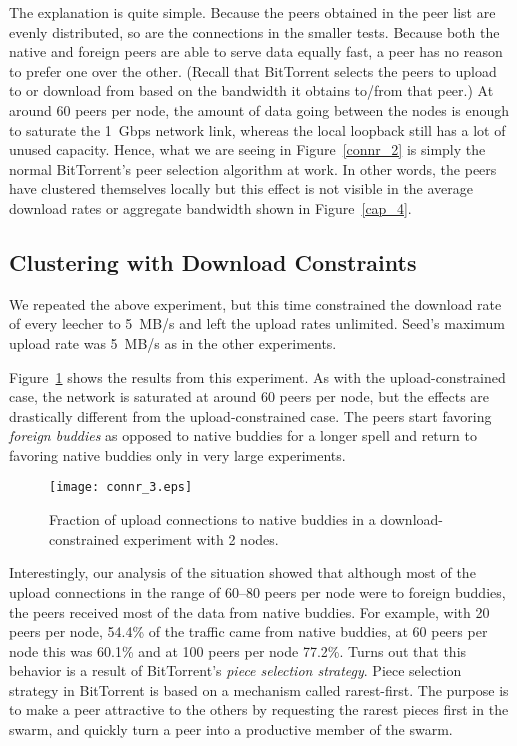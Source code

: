 \documentclass[10pt,letterpaper,twocolumn]{article}
\begin{document}
The explanation is quite simple. Because the peers obtained in the
peer list are evenly distributed, so are the connections in the
smaller tests. Because both the native and foreign peers are able to
serve data equally fast, a peer has no reason to prefer one over the
other. (Recall that BitTorrent selects the peers to upload to or
download from based on the bandwidth it obtains to/from that peer.) At
around 60 peers per node, the amount of data going between the nodes
is enough to saturate the 1~Gbps network link, whereas the local
loopback still has a lot of unused capacity. Hence, what we are seeing
in Figure~\ref{connr_2} is simply the normal BitTorrent's peer
selection algorithm at work. In other words, the peers have clustered
themselves locally but this effect is not visible in the average
download rates or aggregate bandwidth shown in Figure~\ref{cap_4}. 





\subsection{Clustering with Download Constraints}
\label{cluster_nodes_dl}

We repeated the above experiment, but this time constrained the
download rate of every leecher to 5~MB/s and left the upload rates
unlimited. Seed's maximum upload rate was 5~MB/s as in the other
experiments. 



Figure~\ref{connr_3} shows the results from this experiment. As with
the upload-constrained case, the network is saturated at around 60
peers per node, but the effects are drastically different from the
upload-constrained case. The peers start favoring \textit{foreign
  buddies} as opposed to native buddies for a longer spell and return
to favoring native buddies only in very large experiments.



\begin{figure}[!tb]
\begin{center}
\texttt{[image: connr\_3.eps]}
\caption{Fraction of upload connections to native buddies in a
  download-constrained experiment with 2 nodes.}
\label{connr_3}
\end{center}
\end{figure}





Interestingly, our analysis of the situation showed that although most
of the upload connections in the range of 60--80 peers per node were
to foreign buddies, the peers received most of the data from native
buddies. For example, with 20 peers per node, 54.4\% of the traffic
came from native buddies, at 60 peers per node this was 60.1\% and at
100 peers per node 77.2\%. Turns out that this behavior is a result of
BitTorrent's \textit{piece selection strategy}. Piece selection
strategy in BitTorrent is based on a mechanism called
rarest-first. The purpose is to make a peer attractive to the others
by requesting the rarest pieces first in the swarm, and quickly turn a
peer into a productive member of the swarm.
\end{document}
